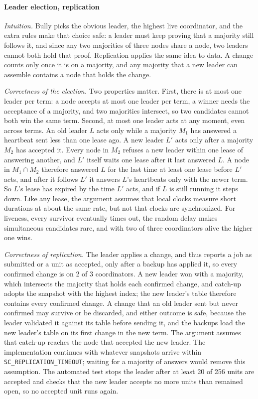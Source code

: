 \paragraph{Leader election, replication} \emph{Intuition.} Bully picks the obvious leader, the highest live coordinator, and the extra rules make that choice safe: a leader must keep proving that a majority still follows it, and since any two majorities of three nodes share a node, two leaders cannot both hold that proof. Replication applies the same idea to data. A change counts only once it is on a majority, and any majority that a new leader can assemble contains a node that holds the change.

\emph{Correctness of the election.} Two properties matter. First, there is at most one leader per term: a node accepts at most one leader per term, a winner needs the acceptance of a majority, and two majorities intersect, so two candidates cannot both win the same term. Second, at most one leader acts at any moment, even across terms. An old leader $L$ acts only while a majority $M_1$ has answered a heartbeat sent less than one lease ago. A new leader $L'$ acts only after a majority $M_2$ has accepted it. Every node in $M_2$ refuses a new leader within one lease of answering another, and $L'$ itself waits one lease after it last answered $L$. A node in $M_1 \cap M_2$ therefore answered $L$ for the last time at least one lease before $L'$ acts, and after it follows $L'$ it answers $L$'s heartbeats only with the newer term. So $L$'s lease has expired by the time $L'$ acts, and if $L$ is still running it steps down. Like any lease, the argument assumes that local clocks measure short durations at about the same rate, but not that clocks are synchronized. For liveness, every survivor eventually times out, the random delay makes simultaneous candidates rare, and with two of three coordinators alive the higher one wins.

\emph{Correctness of replication.} The leader applies a change, and thus reports a job as submitted or a unit as accepted, only after a backup has applied it, so every confirmed change is on 2 of 3 coordinators. A new leader won with a majority, which intersects the majority that holds each confirmed change, and catch-up adopts the snapshot with the highest index; the new leader's table therefore contains every confirmed change. A change that an old leader sent but never confirmed may survive or be discarded, and either outcome is safe, because the leader validated it against its table before sending it, and the backups load the new leader's table on its first change in the new term. The argument assumes that catch-up reaches the node that accepted the new leader. The implementation continues with whatever snapshots arrive within \texttt{SC\_REPLICATION\_TIMEOUT}; waiting for a majority of answers would remove this assumption. The automated test stops the leader after at least 20 of 256 units are accepted and checks that the new leader accepts no more units than remained open, so no accepted unit runs again.

